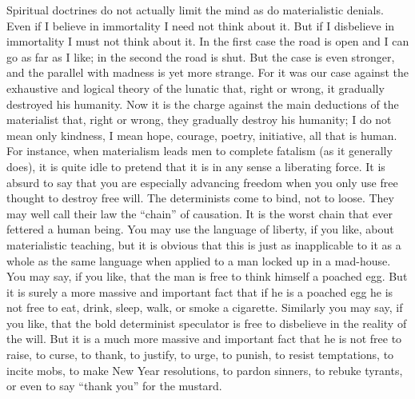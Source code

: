 Spiritual doctrines do not actually limit the mind as do materialistic denials. Even if I believe in immortality I need not think about it. But if I disbelieve in immortality I must not think about it. In the first case the road is open and I can go as far as I like; in the second the road is shut. But the case is even stronger, and the parallel with madness is yet more strange. For it was our case against the exhaustive and logical theory of the lunatic that, right or wrong, it gradually destroyed his humanity. Now it is the charge against the main deductions of the materialist that, right or wrong, they gradually destroy his humanity; I do not mean only kindness, I mean hope, courage, poetry, initiative, all that is human. For instance, when materialism leads men to complete fatalism (as it generally does), it is quite idle to pretend that it is in any sense a liberating force. It is absurd to say that you are especially advancing freedom when you only use free thought to destroy free will. The determinists come to bind, not to loose. They may well call their law the “chain” of causation. It is the worst chain that ever fettered a human being. You may use the language of liberty, if you like, about materialistic teaching, but it is obvious that this is just as inapplicable to it as a whole as the same language when applied to a man locked up in a mad-house. You may say, if you like, that the man is free to think himself a poached egg. But it is surely a more massive and important fact that if he is a poached egg he is not free to eat, drink, sleep, walk, or smoke a cigarette. Similarly you may say, if you like, that the bold determinist speculator is free to disbelieve in the reality of the will. But it is a much more massive and important fact that he is not free to raise, to curse, to thank, to justify, to urge, to punish, to resist temptations, to incite mobs, to make New Year resolutions, to pardon sinners, to rebuke tyrants, or even to say “thank you” for the mustard.

